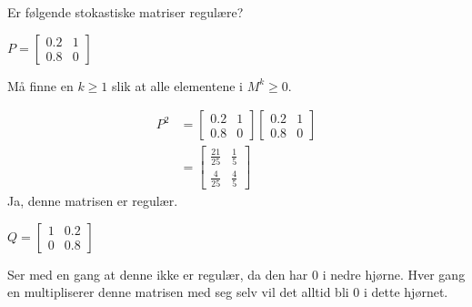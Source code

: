 \documentclass[11pt, a4paper, norsk]{NTNUoving}
\begin{document}
   \begin{oppgave}
       Er følgende stokastiske matriser regulære?
       \begin{punkt}
           $P = \begin{bmatrix}
               0.2 & 1 \\
               0.8 & 0
           \end{bmatrix}$

           Må finne en $k \geq 1$ slik at alle elementene i $M^k \geq 0$.

           \begin{align*}
               P^2 &= \begin{bmatrix}
                   0.2 & 1 \\
                   0.8 & 0
               \end{bmatrix}\begin{bmatrix}
                   0.2 & 1 \\
                   0.8 & 0
               \end{bmatrix}
               \\
                   &= \begin{bmatrix}
                       \frac{21}{25} & \frac{1}{5} \\
                       \frac{4}{25} & \frac{4}{5}
                   \end{bmatrix}
           \end{align*}
           Ja, denne matrisen er regulær.
       \end{punkt}
       \begin{punkt}
           $Q = \begin{bmatrix}
               1 & 0.2 \\
               0 & 0.8
           \end{bmatrix}$

           Ser med en gang at denne ikke er regulær, da den har 0 i nedre hjørne. Hver gang en multipliserer denne matrisen med seg selv vil det alltid bli 0 i dette hjørnet. 
       \end{punkt}
   \end{oppgave}
\end{document}
